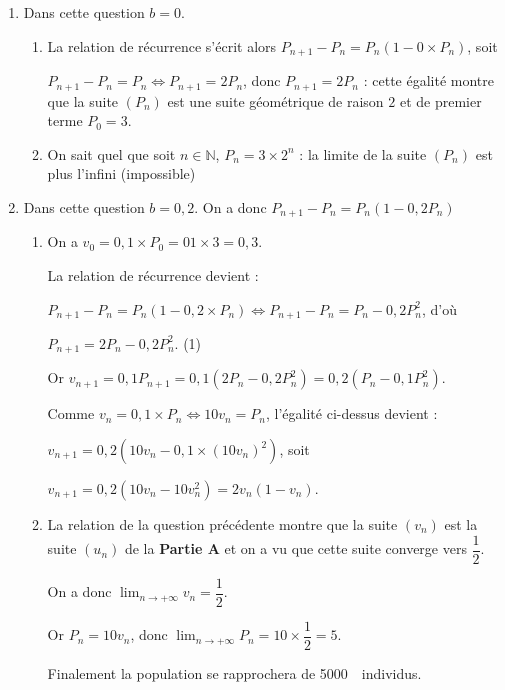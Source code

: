 \documentclass[10pt]{article}
\providecommand{\N}{\mathbb{N}}
\providecommand{\np}[2][]{{#2~#1}}
\begin{document}
\begin{enumerate}
\item Dans cette question $b  = 0$.
	\begin{enumerate}
		\item 
		La relation de récurrence s'écrit alors $P_{n+1} - P_n = P_n\left(1 - 0 \times P_n\right)$, soit 

$P_{n+1} - P_n = P_n \iff P_{n+1}  = 2 P_n$, donc $P_{n+1} = 2 P_n$ : cette égalité montre que la suite $\left(P_n\right)$ est une suite géométrique de raison $2$ et de premier terme $P_0 = 3$.
		\item 
On sait quel que soit $n \in \N$, \: $P_n = 3 \times 2^n$ : la limite de la suite $\left(P_n\right)$ est plus l'infini (impossible)
	\end{enumerate}
\item Dans cette question $b = 0,2$. On a donc $P_{n+1} - P_n = P_n\left(1 - 0,2P_n\right)$
	\begin{enumerate}
		\item 


On a $v_0 = 0,1 \times P_0 = 01 \times 3 = 0,3$.

La relation de récurrence devient :

$P_{n+1} -  P_n = P_n\left(1 -  0,2 \times P_n\right) \iff P_{n+1} -  P_n = P_n - 0,2P_n^2$, d'où

$P_{n+1} = 2P_n - 0,2P_n^2$. \: (1)

Or $v_{n+1} = 0,1P_{n+1} = 0,1\left(2P_n - 0,2P_n^2\right) = 0,2\left(P_n - 0,1P_n^2\right)$.

Comme $v_n = 0,1 \times P_n \iff 10v_n = P_n$, l'égalité ci-dessus devient :

$v_{n+1} = 0,2\left(10v_n - 0,1 \times \left(10v_n\right)^2\right)$, soit 

$v_{n+1} = 0,2\left(10v_n - 10v_n^2\right) = 2v_n \left(1 - v_n\right)$.
		\item 
La relation de la question précédente montre que la suite $\left(v_n \right)$ est la suite $\left(u_n \right)$ de la \textbf{Partie A} et on a vu que cette suite converge vers $\dfrac12$.

On a donc $\displaystyle\lim_{n \to + \infty} v_n = \dfrac12$.

Or $P_n = 10v_n$, donc $\displaystyle\lim_{n \to + \infty}P_n = 10 \times \dfrac12 = 5$.

Finalement la population se rapprochera de \np{5000}~individus.
	\end{enumerate}
\end{enumerate}
\end{document}
